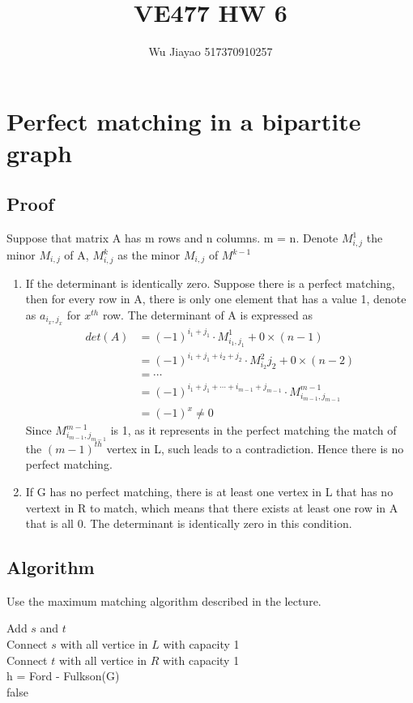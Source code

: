 \documentclass[12pt,a4paper]{article}
\title{VE477 HW 6}
\author{Wu Jiayao 517370910257}
\theoremstyle{definition}
\begin{document}
\maketitle
\section{Perfect matching in a bipartite graph}
\subsection{Proof}
Suppose that matrix A has m rows and n columns. m = n. Denote $M^1_{i,j}$ the minor $M_{i,j}$ of A, $M^{k}_{i,j}$ as the minor $M_{i,j}$ of $M^{k-1}$
\begin{enumerate}
    \item If the determinant is identically zero. Suppose there is a perfect matching, then for every row in A, there is only one element that has a value 1, denote as $a_{i_x,j_x}$ for $x^{th}$ row. The determinant of A is expressed as
    \begin{align*}
        det(A) &= (-1)^{i_1+j_1} \cdot M^{1}_{i_1,j_1} + 0 \times (n-1) \\
        &= (-1)^{i_1+j_1+i_2+j_2} \cdot M^{2}_{i_2}{j_2} + 0 \times (n-2)\\
        &= \cdots \\
        &= (-1)^{i_1+j_1+\cdots+i_{m-1}+j_{m-1}} \cdot M^{m-1}_{i_{m-1},j_{m-1}} \\
        &= (-1)^{x} \neq 0
    \end{align*}
    Since $M^{m-1}_{i_{m-1},j_{m-1}}$ is 1, as it represents in the perfect matching the match of the $(m-1)^{th}$ vertex in L, such leads to a contradiction. Hence there is no perfect matching.
    \item If G has no perfect matching, there is at least one vertex in L that has no vertext in R to match, which means that there exists at least one row in A that is all 0. The determinant is identically zero in this condition.
\end{enumerate}
\subsection{Algorithm}
Use the maximum matching algorithm described in the lecture. \\
\begin{algorithm}[H]
    Add $s$ and $t$ \\
    Connect $s$ with all vertice in $L$ with capacity 1 \\
    Connect $t$ with all vertice in $R$ with capacity 1 \\
    h = Ford - Fulkson(G) \\
    \Return false
\end{algorithm}
\end{document}
